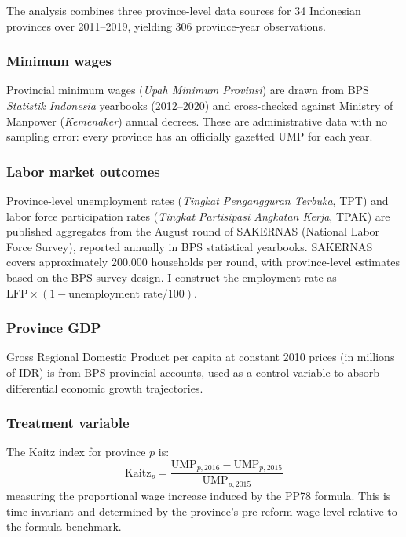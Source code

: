 \documentclass[12pt]{article}
\begin{document}
The analysis combines three province-level data sources for 34 Indonesian provinces over 2011--2019, yielding 306 province-year observations.

\subsubsection*{Minimum wages} Provincial minimum wages (\textit{Upah Minimum Provinsi}) are drawn from BPS \textit{Statistik Indonesia} yearbooks (2012--2020) and cross-checked against Ministry of Manpower (\textit{Kemenaker}) annual decrees. These are administrative data with no sampling error: every province has an officially gazetted UMP for each year.

\subsubsection*{Labor market outcomes} Province-level unemployment rates (\textit{Tingkat Pengangguran Terbuka}, TPT) and labor force participation rates (\textit{Tingkat Partisipasi Angkatan Kerja}, TPAK) are published aggregates from the August round of SAKERNAS (National Labor Force Survey), reported annually in BPS statistical yearbooks. SAKERNAS covers approximately 200,000 households per round, with province-level estimates based on the BPS survey design. I construct the employment rate as $\text{LFP} \times (1 - \text{unemployment rate} / 100)$.

\subsubsection*{Province GDP} Gross Regional Domestic Product per capita at constant 2010 prices (in millions of IDR) is from BPS provincial accounts, used as a control variable to absorb differential economic growth trajectories.

\subsubsection*{Treatment variable} The Kaitz index for province $p$ is:
\begin{equation}
\text{Kaitz}_p = \frac{\text{UMP}_{p,2016} - \text{UMP}_{p,2015}}{\text{UMP}_{p,2015}}
\end{equation}
measuring the proportional wage increase induced by the PP78 formula. This is time-invariant and determined by the province's pre-reform wage level relative to the formula benchmark.


\end{document}
